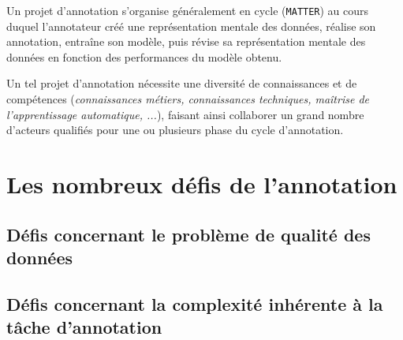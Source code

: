 		
		\begin{leftBarSummary}
			\begin{todolist}
				\item[\itemok] Un projet d'annotation s'organise généralement en cycle (\texttt{MATTER}) au cours duquel l'annotateur créé une représentation mentale des données, réalise son annotation, entraîne son modèle, puis révise sa représentation mentale des données en fonction des performances du modèle obtenu.
				\item[\itemok] Un tel projet d'annotation nécessite une diversité de connaissances et de compétences (\textit{connaissances métiers, connaissances techniques, maîtrise de l'apprentissage automatique, ...}), faisant ainsi collaborer un grand nombre d'acteurs qualifiés pour une ou plusieurs phase du cycle d'annotation.
			\end{todolist}
		\end{leftBarSummary}
	
	
    \section{Les nombreux défis de l'annotation}
	\label{section:2.3-DEFIS-ANNOTATION}
		
		
		\subsection{Défis concernant le problème de qualité des données}
		\label{section:2.3.1-DEFIS-ANNOTATION-ASPECT-DONNEES}
		
		
		\subsection{Défis concernant la complexité inhérente à la tâche d'annotation}
		\label{section:2.3.2-DEFIS-ANNOTATION-ASPECT-COMPLEXITE}
		
